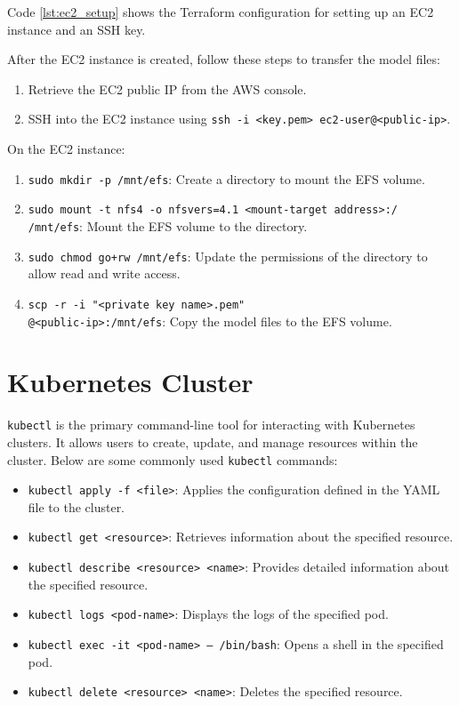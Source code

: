 Code \ref{lst:ec2_setup} shows the Terraform configuration for setting up an EC2 instance and an SSH key. 

After the EC2 instance is created, follow these steps to transfer the model files:

\begin{enumerate}
    \item Retrieve the EC2 public IP from the AWS console.
    \item SSH into the EC2 instance using \texttt{ssh -i <key.pem> ec2-user@<public-ip>}.
\end{enumerate}

On the EC2 instance:
\begin{enumerate}
    \item \texttt{sudo mkdir -p /mnt/efs}: Create a directory to mount the EFS volume.
    \item 
        \begin{sloppypar}
        \texttt{sudo mount -t nfs4 -o nfsvers=4.1 <mount-target address>:/ /mnt/efs}: Mount the EFS volume to the directory.
        \end{sloppypar}
    \item \texttt{sudo chmod go+rw /mnt/efs}: Update the permissions of the directory to allow read and write access.

    \item 
        \begin{sloppypar}
        \texttt{scp -r -i "<private key name>.pem"   \\<model-directory>@<public-ip>:/mnt/efs}: Copy the model files to the EFS volume.\enlargethispage{1\baselineskip}
        \end{sloppypar}
\end{enumerate}
\section{Kubernetes Cluster}
\texttt{kubectl} is the primary command-line tool for interacting with Kubernetes clusters. It allows users to create, update, and manage resources within the cluster. Below are some commonly used \texttt{kubectl} commands:

\begin{itemize}
    \item \texttt{kubectl apply -f <file>}: Applies the configuration defined in the YAML file to the cluster.
    \item \texttt{kubectl get <resource>}: Retrieves information about the specified resource.
    \item \texttt{kubectl describe <resource> <name>}: Provides detailed information about the specified resource.
    \item \texttt{kubectl logs <pod-name>}: Displays the logs of the specified pod.
    \item \texttt{kubectl exec -it <pod-name> -- /bin/bash}: Opens a shell in the specified pod.
    \item \texttt{kubectl delete <resource> <name>}: Deletes the specified resource.
\end{itemize}

